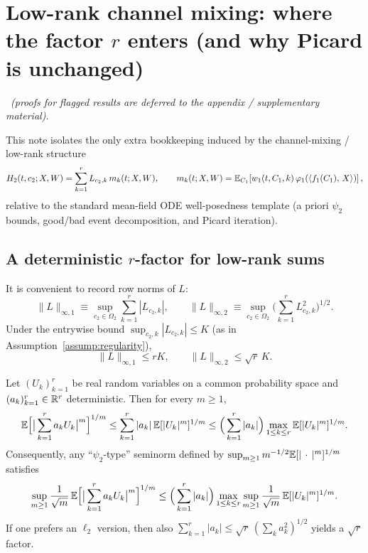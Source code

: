 \section{Low-rank channel mixing: where the factor $r$ enters (and why Picard is unchanged)}

\providecommand{\provedflag}{}
\providecommand{\openflag}{}
\providecommand{\proofinapp}[1]{\emph{Proof deferred to appendix.}}

\noindent\provedflag\ \textit{(proofs for flagged results are deferred to the appendix / supplementary material).}

This note isolates the only extra bookkeeping induced by the channel-mixing / low-rank structure
\[
H_2(t,c_2;X,W)=\sum_{k=1}^r L_{c_2,k}\,m_k(t;X,W),\qquad
m_k(t;X,W)=\mathbb{E}_{C_1}\!\left[w_1(t,C_1,k)\,\varphi_1(\left\langle f_1(C_1),\,X \right\rangle)\right],
\]
relative to the standard mean-field ODE well-posedness template (a priori $\psi_2$ bounds, good/bad event decomposition, and Picard iteration).

\subsection{A deterministic $r$-factor for low-rank sums}

It is convenient to record row norms of $L$:
\[
\|L\|_{\infty,1}\equiv \sup_{c_2\in\Omega_2}\sum_{k=1}^r |L_{c_2,k}|,\qquad
\|L\|_{\infty,2}\equiv \sup_{c_2\in\Omega_2}\Big(\sum_{k=1}^r L_{c_2,k}^2\Big)^{1/2}.
\]
Under the entrywise bound $\sup_{c_2,k}|L_{c_2,k}|\le K$ (as in Assumption~\ref{assump:regularity}),
\[
\|L\|_{\infty,1}\le rK,\qquad \|L\|_{\infty,2}\le \sqrt{r}\,K.
\]

\begin{lemma}\label{lem:lowrank-psi}
Let $(U_k)_{k=1}^r$ be real random variables on a common probability space and $(a_k)_{k=1}^r\in\mathbb{R}^r$ deterministic.
Then for every $m\ge 1$,
\[
\mathbb{E}\Big[\big|\sum_{k=1}^r a_k U_k\big|^m\Big]^{1/m}\le \sum_{k=1}^r |a_k|\,\mathbb{E}[|U_k|^m]^{1/m}
\le \Big(\sum_{k=1}^r |a_k|\Big)\max_{1\le k\le r}\mathbb{E}[|U_k|^m]^{1/m}.
\]
Consequently, any ``$\psi_2$-type'' seminorm defined by $\sup_{m\ge 1}m^{-1/2}\mathbb{E}[|\,\cdot\,|^m]^{1/m}$ satisfies
\[
\sup_{m\ge 1}\frac{1}{\sqrt{m}}\,\mathbb{E}\Big[\big|\sum_{k=1}^r a_k U_k\big|^m\Big]^{1/m}
\le \Big(\sum_{k=1}^r |a_k|\Big)\max_{1\le k\le r}\sup_{m\ge 1}\frac{1}{\sqrt{m}}\,\mathbb{E}[|U_k|^m]^{1/m}.
\]
If one prefers an $\ell_2$ version, then also $\sum_{k=1}^r |a_k|\le \sqrt{r}\,(\sum_k a_k^2)^{1/2}$ yields a $\sqrt{r}$ factor.
\end{lemma}


